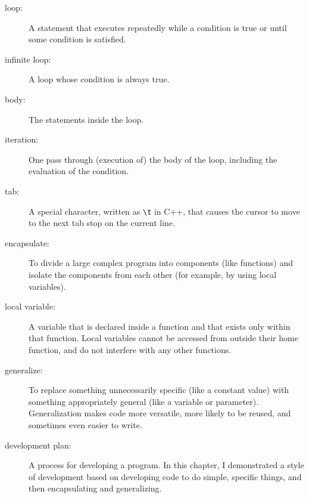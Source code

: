 \begin{description}

\item[loop:]  A statement that executes repeatedly while a
condition is true or until some condition is satisfied.

\item[infinite loop:]  A loop whose condition is always true.

\item[body:]  The statements inside the loop.

\item[iteration:]  One pass through (execution of) the body
of the loop, including the evaluation of the condition.

\item[tab:] A special character, written as \verb+\t+ in C++,
that causes the cursor to move to the next tab stop on the
current line.

\item[encapsulate:]  To divide a large complex program into
components (like functions) and isolate the components from
each other (for example, by using local variables).

\item[local variable:]  A variable that is declared inside
a function and that exists only within that function.  Local variables
cannot be accessed from outside their home function, and do not
interfere with any other functions.

\item[generalize:]  To replace something unnecessarily specific
(like a constant value) with something appropriately general
(like a variable or parameter).  Generalization makes code more
versatile, more likely to be reused, and sometimes even easier
to write.

\item[development plan:]  A process for developing a program.
In this chapter, I demonstrated a style of development based on
developing code to do simple, specific things, and then encapsulating
and generalizing.


\end{description}

